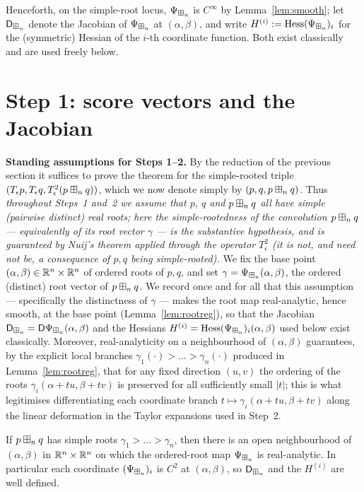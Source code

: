 \noindent Henceforth, on the simple-root locus, $\Psi_{\boxplus_n}$ is $C^\infty$ by
Lemma~\ref{lem:smooth}; let $\mathsf{D}_{\boxplus_n}$ denote the Jacobian of $\Psi_{\boxplus_n}$ at
$(\alpha,\beta)$, and write $H^{(i)}:=\operatorname{Hess}(\Psi_{\boxplus_n})_i$ for the
(symmetric) Hessian of the $i$-th coordinate function. Both exist classically and
are used freely below.

\section*{Step 1: score vectors and the Jacobian}

\noindent\textbf{Standing assumptions for Steps 1--2.} By the reduction of the
previous section it suffices to prove the theorem for the simple-rooted triple
$(T_\epsilon p,T_\epsilon q,T_\epsilon^2(p\boxplus_n q))$, which we now denote
simply by $(p,q,p\boxplus_n q)$. Thus \emph{throughout Steps~1 and~2 we assume that
$p$, $q$ and $p\boxplus_n q$ all have simple (pairwise distinct) real roots; here
the simple-rootedness of the convolution $p\boxplus_n q$ — equivalently of its root
vector $\gamma$ — is the substantive hypothesis, and is guaranteed by Nuij's
theorem applied through the operator $T_\epsilon^2$ (it is not, and need not be, a
consequence of $p,q$ being simple-rooted).} We fix the base point
$(\alpha,\beta)\in\mathbb{R}^n\times\mathbb{R}^n$ of ordered roots of $p,q$, and set
$\gamma=\Psi_{\boxplus_n}(\alpha,\beta)$, the ordered (distinct) root vector of
$p\boxplus_n q$. We record once and for all that this assumption — specifically the
distinctness of $\gamma$ — makes the root map real-analytic, hence smooth, at the
base point (Lemma~\ref{lem:rootreg}), so that the Jacobian
$\mathsf{D}_{\boxplus_n}=\mathsf D\Psi_{\boxplus_n}(\alpha,\beta)$ and the Hessians
$H^{(i)}=\operatorname{Hess}(\Psi_{\boxplus_n})_i(\alpha,\beta)$ used below exist classically.
Moreover, real-analyticity on a neighbourhood of $(\alpha,\beta)$ guarantees, by
the explicit local branches $\gamma_1(\cdot)>\dots>\gamma_n(\cdot)$ produced in
Lemma~\ref{lem:rootreg}, that for any fixed direction $(u,v)$ the ordering of the
roots $\gamma_i(\alpha+tu,\beta+tv)$ is preserved for all sufficiently small
$|t|$; this is what legitimises differentiating each coordinate branch
$t\mapsto\gamma_i(\alpha+tu,\beta+tv)$ along the linear deformation in the Taylor
expansions used in Step~2.

\begin{qfourlemma}\label{lem:rootreg}
If $p\boxplus_n q$ has simple roots $\gamma_1>\dots>\gamma_n$, then there is an open
neighbourhood of $(\alpha,\beta)$ in $\mathbb{R}^n\times\mathbb{R}^n$ on which the
ordered-root map $\Psi_{\boxplus_n}$ is real-analytic. In particular each coordinate
$(\Psi_{\boxplus_n})_i$ is $C^2$ at $(\alpha,\beta)$, so $\mathsf{D}_{\boxplus_n}$ and the $H^{(i)}$
are well defined.
\end{qfourlemma}

